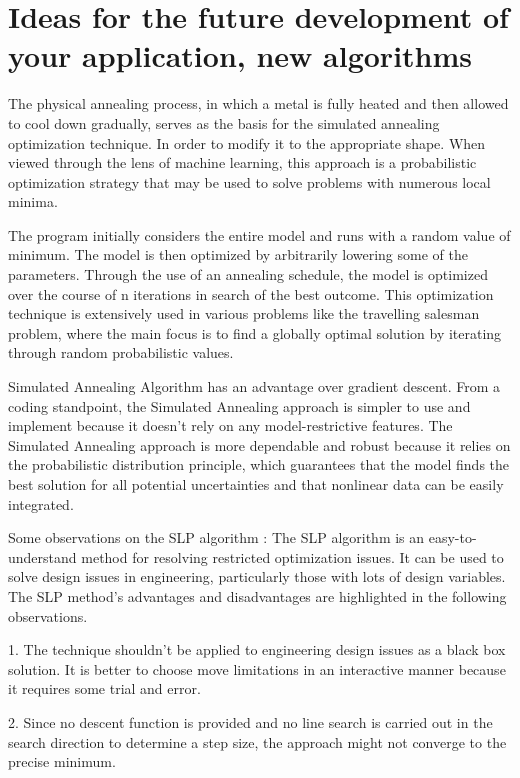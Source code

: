 \section{Ideas for the future development of your
application, new algorithms
}
\label{ideas-for-the-future-development-of-your-application-new-algorithms}
The physical annealing process, in which a metal is fully heated and then allowed to cool down gradually, serves as the basis for the simulated annealing optimization technique. In order to modify it to the appropriate shape. When viewed through the lens of machine learning, this approach is a probabilistic optimization strategy that may be used to solve problems with numerous local minima.

The program initially considers the entire model and runs with a random value of minimum. The model is then optimized by arbitrarily lowering some of the parameters. Through the use of an annealing schedule, the model is optimized over the course of n iterations in search of the best outcome. 
This optimization technique is extensively used in various problems like the travelling salesman problem, where the main focus is to find a globally optimal solution by iterating through random probabilistic values.

Simulated Annealing Algorithm has an advantage over gradient descent. From a coding standpoint, the Simulated Annealing approach is simpler to use and implement because it doesn't rely on any model-restrictive features. The Simulated Annealing approach is more dependable and robust because it relies on the probabilistic distribution principle, which guarantees that the model finds the best solution for all potential uncertainties and that nonlinear data can be easily integrated.

Some observations on the SLP algorithm :
The SLP algorithm is an easy-to-understand method for resolving restricted optimization issues. It can be used to solve design issues in engineering, particularly those with lots of design variables. The SLP method's advantages and disadvantages are highlighted in the following observations.

1. The technique shouldn't be applied to engineering design issues as a black box solution. It is better to choose move limitations in an interactive manner because it requires some trial and error.

2. Since no descent function is provided and no line search is carried out in the search direction to determine a step size, the approach might not converge to the precise minimum.

